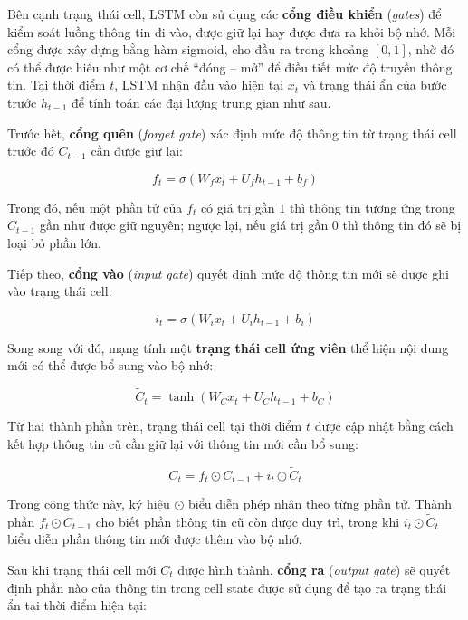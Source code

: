 \documentclass[12pt,oneside]{report}
\begin{document}
Bên cạnh trạng thái cell, LSTM còn sử dụng các \textbf{cổng điều khiển} (\textit{gates}) để kiểm soát luồng thông tin đi vào, được giữ lại hay được đưa ra khỏi bộ nhớ. Mỗi cổng được xây dựng bằng hàm sigmoid, cho đầu ra trong khoảng $[0,1]$, nhờ đó có thể được hiểu như một cơ chế ``đóng -- mở'' để điều tiết mức độ truyền thông tin. Tại thời điểm $t$, LSTM nhận đầu vào hiện tại $x_t$ và trạng thái ẩn của bước trước $h_{t-1}$ để tính toán các đại lượng trung gian như sau.

Trước hết, \textbf{cổng quên} (\textit{forget gate}) xác định mức độ thông tin từ trạng thái cell trước đó $C_{t-1}$ cần được giữ lại:

\begin{equation}
f_t = \sigma(W_f x_t + U_f h_{t-1} + b_f)
\end{equation}

Trong đó, nếu một phần tử của $f_t$ có giá trị gần $1$ thì thông tin tương ứng trong $C_{t-1}$ gần như được giữ nguyên; ngược lại, nếu giá trị gần $0$ thì thông tin đó sẽ bị loại bỏ phần lớn.

Tiếp theo, \textbf{cổng vào} (\textit{input gate}) quyết định mức độ thông tin mới sẽ được ghi vào trạng thái cell:

\begin{equation}
i_t = \sigma(W_i x_t + U_i h_{t-1} + b_i)
\end{equation}

Song song với đó, mạng tính một \textbf{trạng thái cell ứng viên} thể hiện nội dung mới có thể được bổ sung vào bộ nhớ:

\begin{equation}
\tilde{C}_t = \tanh(W_C x_t + U_C h_{t-1} + b_C)
\end{equation}

Từ hai thành phần trên, trạng thái cell tại thời điểm $t$ được cập nhật bằng cách kết hợp thông tin cũ cần giữ lại với thông tin mới cần bổ sung:

\begin{equation}
C_t = f_t \odot C_{t-1} + i_t \odot \tilde{C}_t
\end{equation}

Trong công thức này, ký hiệu $\odot$ biểu diễn phép nhân theo từng phần tử. Thành phần $f_t \odot C_{t-1}$ cho biết phần thông tin cũ còn được duy trì, trong khi $i_t \odot \tilde{C}_t$ biểu diễn phần thông tin mới được thêm vào bộ nhớ.

Sau khi trạng thái cell mới $C_t$ được hình thành, \textbf{cổng ra} (\textit{output gate}) sẽ quyết định phần nào của thông tin trong cell state được sử dụng để tạo ra trạng thái ẩn tại thời điểm hiện tại:
\end{document}

